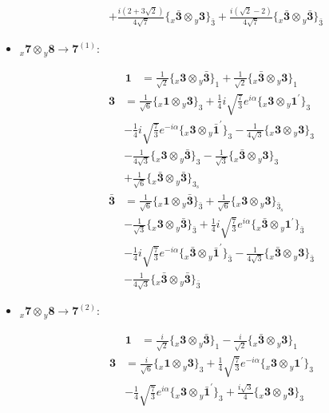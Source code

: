 \documentclass[english]{article}
\newcommand{\rep}[1]{\mathbf{#1}}
\newcommand{\repx}[2]{{}_{#2}\mathbf{#1}}
\newcommand{\tsprodx}[2]{\repx{#1}{x}\otimes\repx{#2}{y}}
\newcommand{\subcgt}[3]{\big\{ \tsprodx{#1}{#2}\big\}^{}_{#3}}
\begin{document}
\begin{itemize}
\begin{fleqn}
\begin{align*}
 & +\frac{i \left(2+3 \sqrt{2}\right)}{4 \sqrt{7}}\subcgt{\bar{3}}{3}{\bar{3}}+\frac{i \left(\sqrt{2}-2\right)}{4 \sqrt{7}}\subcgt{\bar{3}}{\bar{3}}{\bar{3}}
\end{align*}
\end{fleqn}
\item $\tsprodx{7}{8}\to\rep{7}^{(1)}$:
\begin{fleqn}
\begin{align*}
\rep{1} & = \frac{1}{\sqrt{2}}\subcgt{3}{\bar{3}}{1}+\frac{1}{\sqrt{2}}\subcgt{\bar{3}}{3}{1}
\end{align*}
\begin{align*}
\rep{3} & = \frac{1}{\sqrt{6}}\subcgt{1}{3}{3}+\frac{1}{4} i \sqrt{\frac{7}{3}} e^{i \alpha }\subcgt{3}{1^{\prime}}{3} \\ 
 & -\frac{1}{4} i \sqrt{\frac{7}{3}} e^{-i \alpha }\subcgt{3}{\bar{1}^{\prime}}{3}-\frac{1}{4 \sqrt{3}}\subcgt{3}{3}{3} \\ 
 & -\frac{1}{4 \sqrt{3}}\subcgt{3}{\bar{3}}{3}-\frac{1}{\sqrt{3}}\subcgt{\bar{3}}{3}{3} \\ 
 & +\frac{1}{\sqrt{6}}\subcgt{\bar{3}}{\bar{3}}{3_{s}}
\end{align*}
\begin{align*}
\rep{\bar{3}} & = \frac{1}{\sqrt{6}}\subcgt{1}{\bar{3}}{\bar{3}}+\frac{1}{\sqrt{6}}\subcgt{3}{3}{\bar{3}_{s}} \\ 
 & -\frac{1}{\sqrt{3}}\subcgt{3}{\bar{3}}{\bar{3}}+\frac{1}{4} i \sqrt{\frac{7}{3}} e^{i \alpha }\subcgt{\bar{3}}{1^{\prime}}{\bar{3}} \\ 
 & -\frac{1}{4} i \sqrt{\frac{7}{3}} e^{-i \alpha }\subcgt{\bar{3}}{\bar{1}^{\prime}}{\bar{3}}-\frac{1}{4 \sqrt{3}}\subcgt{\bar{3}}{3}{\bar{3}} \\ 
 & -\frac{1}{4 \sqrt{3}}\subcgt{\bar{3}}{\bar{3}}{\bar{3}}
\end{align*}
\end{fleqn}
\item $\tsprodx{7}{8}\to\rep{7}^{(2)}$:
\begin{fleqn}
\begin{align*}
\rep{1} & = \frac{i}{\sqrt{2}}\subcgt{3}{\bar{3}}{1}-\frac{i}{\sqrt{2}}\subcgt{\bar{3}}{3}{1}
\end{align*}
\begin{align*}
\rep{3} & = \frac{i}{\sqrt{6}}\subcgt{1}{3}{3}+\frac{1}{4} \sqrt{\frac{7}{3}} e^{-i \alpha }\subcgt{3}{1^{\prime}}{3} \\ 
 & -\frac{1}{4} \sqrt{\frac{7}{3}} e^{i \alpha }\subcgt{3}{\bar{1}^{\prime}}{3}+\frac{i \sqrt{3}}{4}\subcgt{3}{3}{3} \\ 

\end{align*}
\end{fleqn}
\end{itemize}
\end{document}
